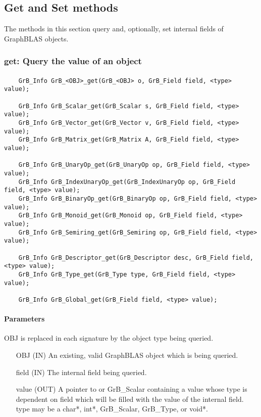 \subsection{Get and Set methods}

The methods in this section query and, optionally, 
set internal fields of GraphBLAS objects.

\subsubsection{{\sf get}: Query the value of an object}

\paragraph{\syntax}

\begin{verbatim}
    GrB_Info GrB_<OBJ>_get(GrB_<OBJ> o, GrB_Field field, <type> value);

    GrB_Info GrB_Scalar_get(GrB_Scalar s, GrB_Field field, <type> value);
    GrB_Info GrB_Vector_get(GrB_Vector v, GrB_Field field, <type> value);
    GrB_Info GrB_Matrix_get(GrB_Matrix A, GrB_Field field, <type> value);

    GrB_Info GrB_UnaryOp_get(GrB_UnaryOp op, GrB_Field field, <type> value);
    GrB_Info GrB_IndexUnaryOp_get(GrB_IndexUnaryOp op, GrB_Field field, <type> value);
    GrB_Info GrB_BinaryOp_get(GrB_BinaryOp op, GrB_Field field, <type> value);
    GrB_Info GrB_Monoid_get(GrB_Monoid op, GrB_Field field, <type> value);
    GrB_Info GrB_Semiring_get(GrB_Semiring op, GrB_Field field, <type> value);

    GrB_Info GrB_Descriptor_get(GrB_Descriptor desc, GrB_Field field, <type> value);
    GrB_Info GrB_Type_get(GrB_Type type, GrB_Field field, <type> value);

    GrB_Info GrB_Global_get(GrB_Field field, <type> value);
\end{verbatim}

\paragraph{Parameters}

{\sf OBJ} is replaced in each signature by the object type being queried.

\begin{itemize}[leftmargin=1.1in]
    \item[{\sf OBJ}] ({\sf IN}) An existing, valid GraphBLAS object which is being queried.
    \item[{\sf field}] ({\sf IN}) The internal field being queried.
    \item[{\sf value}] ({\sf OUT}) A pointer to or {\sf GrB\_Scalar} containing a value whose type is dependent on {\sf field} which will be
                                 filled with the value of the internal field. {\sf type} may be a {\sf char*}, {\sf int*},
                                 {\sf GrB\_Scalar}, {\sf GrB\_Type}, or {\sf void*}.
\end{itemize}

